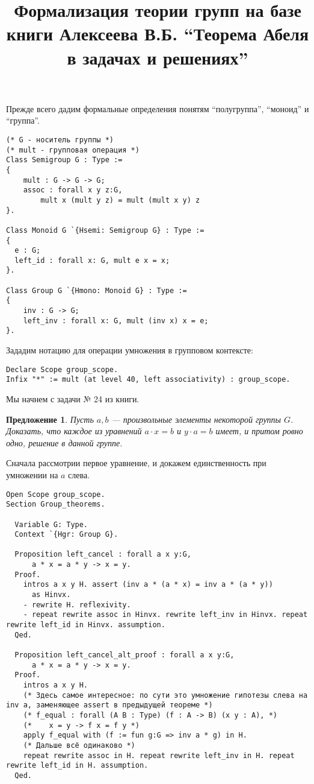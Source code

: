 \documentclass[12pt]{article}
\title{\vspace{-5ex}Формализация теории групп на базе книги Алексеева В.Б. ``Теорема Абеля в задачах и решениях''\vspace{-4ex}}
\newcounter{thm}
\newtheorem{proposition}[thm]{Предложение}
\begin{document}
\maketitle

Прежде всего дадим формальные определения понятям ``полугруппа'', ``моноид'' и ``группа''.

\begin{verbatim}
(* G - носитель группы *)
(* mult - групповая операция *)
Class Semigroup G : Type :=
{
    mult : G -> G -> G;
    assoc : forall x y z:G,
        mult x (mult y z) = mult (mult x y) z
}.

Class Monoid G `{Hsemi: Semigroup G} : Type :=
{
  e : G;
  left_id : forall x: G, mult e x = x;
}.

Class Group G `{Hmono: Monoid G} : Type :=
{
    inv : G -> G;
    left_inv : forall x: G, mult (inv x) x = e;
}.
\end{verbatim}

Зададим нотацию для операции умножения в групповом контексте:

\begin{verbatim}
Declare Scope group_scope.
Infix "*" := mult (at level 40, left associativity) : group_scope.
\end{verbatim}

Мы начнем с задачи № 24 из книги.

\begin{proposition}
Пусть $a, b$ — произвольные элементы некоторой группы $G$. Доказать, что каждое из уравнений $a \cdot x = b$ и $y \cdot a = b$ имеет, и притом ровно одно, решение в данной группе.
\end{proposition}

Сначала рассмотрии первое уравнение, и докажем единственность при умножении на $a$ слева.

\begin{verbatim}
Open Scope group_scope.
Section Group_theorems.

  Variable G: Type.
  Context `{Hgr: Group G}.

  Proposition left_cancel : forall a x y:G,
      a * x = a * y -> x = y.
  Proof.
    intros a x y H. assert (inv a * (a * x) = inv a * (a * y))
      as Hinvx.
    - rewrite H. reflexivity.
    - repeat rewrite assoc in Hinvx. rewrite left_inv in Hinvx. repeat rewrite left_id in Hinvx. assumption.
  Qed.

  Proposition left_cancel_alt_proof : forall a x y:G,
      a * x = a * y -> x = y.
  Proof.
    intros a x y H.
    (* Здесь самое интересное: по сути это умножение гипотезы слева на inv a, заменяющее assert в предыдущей теореме *)
    (* f_equal : forall (A B : Type) (f : A -> B) (x y : A), *)
    (*    x = y -> f x = f y *)
    apply f_equal with (f := fun g:G => inv a * g) in H.
    (* Дальше всё одинаково *)
    repeat rewrite assoc in H. repeat rewrite left_inv in H. repeat rewrite left_id in H. assumption.
  Qed.
\end{verbatim}
\end{document}
